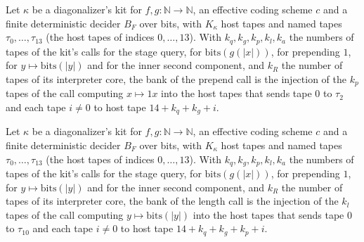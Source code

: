 \begin{definition}
\label{Turing.NTimeDiag.DzKit.bP}
\leanok
{}
Let $\kappa$ be a diagonalizer's kit for $f, g : \mathbb{N} \to \mathbb{N}$, an effective coding scheme $c$ and a finite deterministic decider $B_F$ over bits, with $K_\kappa$ host tapes and named tapes $\tau_0, \dots, \tau_{13}$ (the host tapes of indices $0, \dots, 13$). With $k_q, k_g, k_p, k_l, k_a$ the numbers of tapes of the kit's calls for the stage query, for $\mathrm{bits}(g(|x|))$, for prepending $1$, for $y \mapsto \mathrm{bits}(|y|)$ and for the inner second component, and $k_R$ the number of tapes of its interpreter core, the bank of the prepend call is the injection of the $k_p$ tapes of the call computing $x \mapsto 1x$ into the host tapes that sends tape $0$ to $\tau_2$ and each tape $i \ne 0$ to host tape $14 + k_q + k_g + i$.
\end{definition}

\begin{definition}
\label{Turing.NTimeDiag.DzKit.bL}
\leanok
{}
Let $\kappa$ be a diagonalizer's kit for $f, g : \mathbb{N} \to \mathbb{N}$, an effective coding scheme $c$ and a finite deterministic decider $B_F$ over bits, with $K_\kappa$ host tapes and named tapes $\tau_0, \dots, \tau_{13}$ (the host tapes of indices $0, \dots, 13$). With $k_q, k_g, k_p, k_l, k_a$ the numbers of tapes of the kit's calls for the stage query, for $\mathrm{bits}(g(|x|))$, for prepending $1$, for $y \mapsto \mathrm{bits}(|y|)$ and for the inner second component, and $k_R$ the number of tapes of its interpreter core, the bank of the length call is the injection of the $k_l$ tapes of the call computing $y \mapsto \mathrm{bits}(|y|)$ into the host tapes that sends tape $0$ to $\tau_{10}$ and each tape $i \ne 0$ to host tape $14 + k_q + k_g + k_p + i$.
\end{definition}

